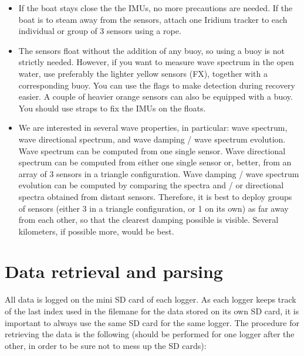 \documentclass[pdftex,a4paper,12pt,twocolumn,fleqn,captions=tableheading]{scrartcl}
\begin{document}
\begin{itemize}
  \item If the boat stays close the the IMUs, no more precautions are needed. If the boat is to steam away from the sensors, attach one Iridium tracker to each individual or group of 3 sensors using a rope.

  \item The sensors float without the addition of any buoy, so using a buoy is not strictly needed. However, if you want to measure wave spectrum in the open water, use preferably the lighter yellow sensors (FX), together with a corresponding buoy. You can use the flags to make detection during recovery easier. A couple of heavier orange sensors can also be equipped with a buoy. You should use straps to fix the IMUs on the floats.

  \item We are interested in several wave properties, in particular: wave spectrum, wave directional spectrum, and wave damping / wave spectrum evolution. Wave spectrum can be computed from one single sensor. Wave directional spectrum can be computed from either one single sensor or, better, from an array of 3 sensors in a triangle configuration. Wave damping / wave spectrum evolution can be computed by comparing the spectra and / or directional spectra obtained from distant sensors. Therefore, it is best to deploy groups of sensors (either 3 in a triangle configuration, or 1 on its own) as far away from each other, so that the clearest damping possible is visible. Several kilometers, if possible more, would be best.
\end{itemize}

\section{Data retrieval and parsing}

All data is logged on the mini SD card of each logger. As each logger keeps track of the last index used in the filemane for the data stored on its own SD card, it is important to always use the same SD card for the same logger. The procedure for retrieving the data is the following (should be performed for one logger after the other, in order to be sure not to mess up the SD cards):
\end{document}
